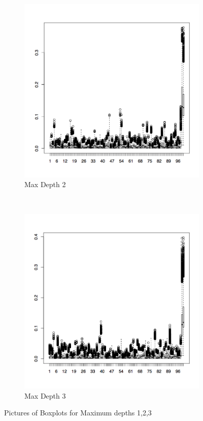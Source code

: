 \documentclass{article}
\begin{document}
\begin{figure}[H]
\begin{subfigure}[b]{0.3\textwidth}
                \includegraphics[width=\textwidth]{c2_boxp}
                \caption{Max Depth 2}
                \label{fig:tiger}
        \end{subfigure}
        ~ %
        \begin{subfigure}[b]{0.3\textwidth}
                \centering
                \includegraphics[width=\textwidth]{c3_boxp}
                \caption{Max Depth 3}
                \label{fig:mouse}
        \end{subfigure}
        \caption{Pictures of Boxplots for Maximum depths 1,2,3}\label{fig:Boxplots123}
\end{figure}
\end{document}

